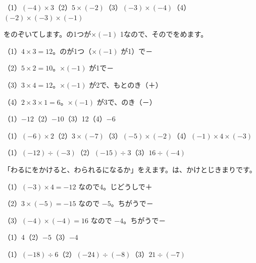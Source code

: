 \begin{reidai}[かけ\R{算}{ざん}]
（1）$(-4)\times3$\quad（2）$5\times(-2)$\quad（3）$(-3)\times(-4)$\quad（4）$(-2)\times(-3)\times(-1)$\par
\kangaekata {}をのぞいてします。の1つが×$(-1)$ 1なので、そのでをめます。\par
\shiki （1）$4\times3=12$。のが1つ（×$(-1)$ が1）で－\par
\hspace*{2.6\zw}（2）$5\times2=10$。×$(-1)$ が1で－\par
\hspace*{2.6\zw}（3）$3\times4=12$。×$(-1)$ が2で、もとのき（＋）\par
\hspace*{2.6\zw}（4）$2\times3\times1=6$。×$(-1)$ が3で、のき（－）\par
\kotae （1）$-12$\quad（2）$-10$\quad（3）12\quad（4）$-6$
\end{reidai}

\begin{jibun}
（1）$(-6)\times2$\quad（2）$3\times(-7)$\quad（3）$(-5)\times(-2)$\quad（4）$(-1)\times4\times(-3)$
\end{jibun}

\begin{reidai}[わり\R{算}{ざん}]
（1）$(-12)\div(-3)$\quad（2）$(-15)\div3$\quad（3）$16\div(-4)$\par
\kangaekata 「わるにをかけると、わられるになるか」をえます。は、かけとじきまりです。\par
\shiki （1）$(-3)\times4=-12$ なので4。じどうしで＋\par
\hspace*{2.6\zw}（2）$3\times(-5)=-15$ なので $-5$。ちがうで－\par
\hspace*{2.6\zw}（3）$(-4)\times(-4)=16$ なので $-4$。ちがうで－\par
\kotae （1）4\quad（2）$-5$\quad（3）$-4$
\end{reidai}

\begin{jibun}
（1）$(-18)\div6$\quad（2）$(-24)\div(-8)$\quad（3）$21\div(-7)$
\end{jibun}

